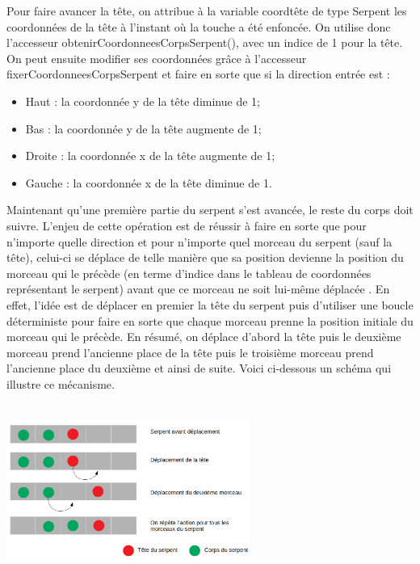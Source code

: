 \documentclass[11pt,a4paper]{article}
\begin{document}
Pour faire avancer la tête, on attribue à la variable coordtête de type Serpent les coordonnées de la tête à l’instant où la touche a été enfoncée. On utilise donc l’accesseur obtenirCoordonneesCorpsSerpent(), avec un indice de 1 pour la tête.
On peut ensuite modifier ses coordonnées grâce à l’accesseur fixerCoordonneesCorpsSerpent et faire en sorte que si la direction entrée est :
\begin{itemize}
 \item Haut : la coordonnée y de la tête diminue de 1;
 \item Bas : la coordonnée y de la tête augmente de 1;
 \item Droite : la coordonnée x de la tête augmente de 1;
 \item Gauche :  la coordonnée x de la tête diminue de 1.
\end{itemize}
Maintenant qu’une première partie du serpent s’est avancée, le reste du corps doit suivre.
 L’enjeu de cette opération est de réussir à faire en sorte que pour n'importe quelle direction et pour n’importe quel morceau du serpent (sauf la tête), celui-ci se déplace de telle manière que sa position devienne la position du morceau qui le précède (en terme d’indice dans le tableau de coordonnées représentant le serpent) avant que ce morceau ne soit lui-même déplacée . En effet, l’idée est de déplacer en premier la tête du serpent puis d’utiliser une boucle déterministe pour faire en sorte que chaque morceau prenne la position initiale du morceau qui le précède. En résumé, on déplace d’abord la tête puis le deuxième morceau prend l’ancienne place de la tête puis le troisième morceau prend l’ancienne place du deuxième et ainsi de suite. Voici ci-dessous un  schéma qui illustre ce mécanisme.\\\\
        
        \centerline{\includegraphics[width=0.6\textwidth]{./images/schemadeplacement.png}
        }
        \vspace*{0.5cm}
        
\end{document}
